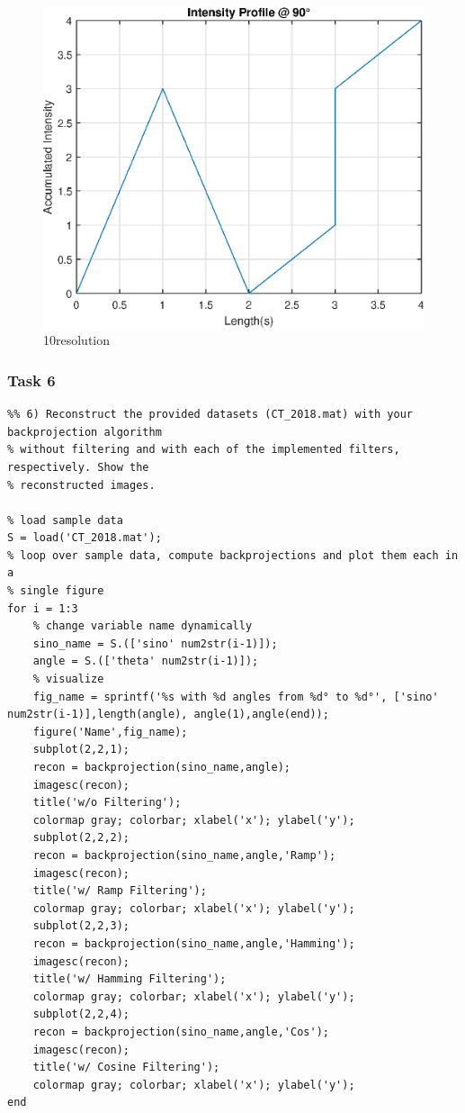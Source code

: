\begin{figure}[htb!]
  \centering
  \includegraphics[width=\linewidth]{homework1/img/4.eps}
  \caption{10\textdegree resolution}
  \label{fig:recon_10deg}
\end{figure}


\clearpage
\newpage


\subsubsection*{Task 6}

\begin{lstlisting}
%% 6) Reconstruct the provided datasets (CT_2018.mat) with your backprojection algorithm
% without filtering and with each of the implemented filters, respectively. Show the
% reconstructed images.

% load sample data
S = load('CT_2018.mat');
% loop over sample data, compute backprojections and plot them each in a
% single figure
for i = 1:3
    % change variable name dynamically
    sino_name = S.(['sino' num2str(i-1)]);
    angle = S.(['theta' num2str(i-1)]);
    % visualize
    fig_name = sprintf('%s with %d angles from %d° to %d°', ['sino' num2str(i-1)],length(angle), angle(1),angle(end));
    figure('Name',fig_name);
    subplot(2,2,1);
    recon = backprojection(sino_name,angle);
    imagesc(recon);
    title('w/o Filtering');
    colormap gray; colorbar; xlabel('x'); ylabel('y');
    subplot(2,2,2);
    recon = backprojection(sino_name,angle,'Ramp');
    imagesc(recon);
    title('w/ Ramp Filtering');
    colormap gray; colorbar; xlabel('x'); ylabel('y');
    subplot(2,2,3);
    recon = backprojection(sino_name,angle,'Hamming');
    imagesc(recon);
    title('w/ Hamming Filtering');
    colormap gray; colorbar; xlabel('x'); ylabel('y');
    subplot(2,2,4);
    recon = backprojection(sino_name,angle,'Cos');
    imagesc(recon);
    title('w/ Cosine Filtering');
    colormap gray; colorbar; xlabel('x'); ylabel('y');
end
\end{lstlisting}

